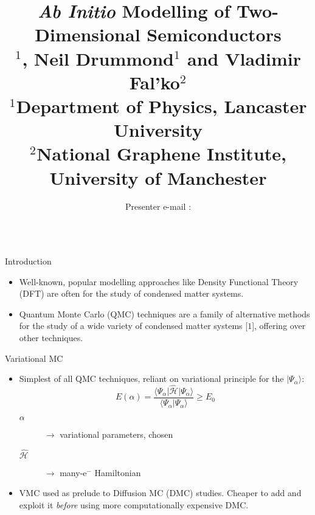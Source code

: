 \documentclass[hyperref={draft}]{beamer}
\title{\textit{Ab Initio} Modelling of Two- \\
	   Dimensional Semiconductors \\
	   \Large{\underline{\smash{Ryan Hunt}}$^1$, Neil Drummond$^1$ and Vladimir Fal'ko$^2$} 
	   \\ \vspace{0.2cm} \normalsize{$^1$Department of Physics, Lancaster University\\ $^2$National Graphene Institute, University of Manchester}}
\author[\large{$\langle$ Alternate : \texttt{ryan.hunt@postgrad.manchester.ac.uk} $\rangle$}]{\Large{Presenter e-mail : \framebox{\strut\ \texttt{r.hunt4@lancaster.ac.uk}\ }}}
\newcommand{\red}[1]{{\bf\color{red}{#1}}}
\newcommand{\ket}[1]{\lvert {#1} \rangle}
\newcommand{\bra}[1]{\langle {#1} \rvert}
\begin{document}
{  }

\begin{frame}[fragile]\centering

\begin{columns}[T]
\hfill
\begin{column}{.46\textwidth}

\begin{block}{Introduction}
\begin{itemize}
\item Well-known, popular modelling approaches like Density Functional Theory (DFT) are often \red{inadequate} for the study of condensed matter systems.
\item Quantum Monte Carlo (QMC) techniques are a family of alternative methods for the study of a wide variety of condensed matter systems [$1$], offering \red{systematic improvement} over other techniques.
\end{itemize}
\end{block}

\begin{block}{Variational MC}
\begin{itemize}
\item Simplest of all QMC techniques, reliant on variational principle for the \red{trial many-e$^-$ wavefunction} $\ket{\Psi_{\alpha}}$:
\begin{equation}
	E(\alpha) = \dfrac{\bra{\Psi_{\alpha}} \mathcal{\hat H} \ket{\Psi_{\alpha}}}{\bra{\Psi_{\alpha}}\Psi_{\alpha} \rangle}
	\geq E_0
\end{equation}
  \begin{description}
  \item[$\alpha$] $\rightarrow$ variational parameters, chosen \red{specially}
  \item[$\mathcal{\hat H}$] $\rightarrow$ many-e$^-$ Hamiltonian

  \end{description}
\item VMC used as prelude to Diffusion MC (DMC) studies. Cheaper to add \red{variational freedom} and exploit it \textit{before} using more computationally expensive DMC.
\end{itemize}
\end{block}


\end{column}
\end{columns}
\end{frame}
\end{document}
